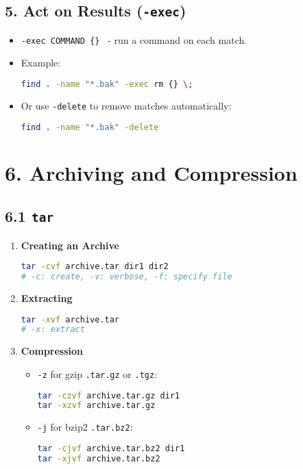 \documentclass[a4paper]{report}
\begin{document}
\subsection*{5. Act on Results (\texttt{-exec})}
\begin{itemize}
    \item \texttt{-exec COMMAND \{\} \;} \text{-}- run a command on each match.
    \item Example:
\begin{lstlisting}[language=bash]
find . -name "*.bak" -exec rm {} \;
\end{lstlisting}
    \item Or use \texttt{-delete} to remove matches automatically:
\begin{lstlisting}[language=bash]
find . -name "*.bak" -delete
\end{lstlisting}
\end{itemize}

\section*{6. Archiving and Compression}
\subsection*{6.1 \texttt{tar}}
\begin{enumerate}
    \item {\textbf{Creating an Archive}}
    \begin{lstlisting}[language=bash]
tar -cvf archive.tar dir1 dir2
# -c: create, -v: verbose, -f: specify file
    \end{lstlisting}
    \item {\textbf{Extracting}}
    \begin{lstlisting}[language=bash]
tar -xvf archive.tar
# -x: extract
    \end{lstlisting}

    \item{\textbf{Compression}}
    \begin{itemize}
        \item \texttt{-z} for gzip \textrightarrow \texttt{.tar.gz} or \texttt{.tgz}:
    \begin{lstlisting}[language=bash]
tar -czvf archive.tar.gz dir1
tar -xzvf archive.tar.gz
    \end{lstlisting}
        \item \texttt{-j} for bzip2 \textrightarrow \texttt{.tar.bz2}:
    \begin{lstlisting}[language=bash]
tar -cjvf archive.tar.bz2 dir1
tar -xjvf archive.tar.bz2
    \end{lstlisting}
    \end{itemize}

\end{enumerate}
\end{document}
